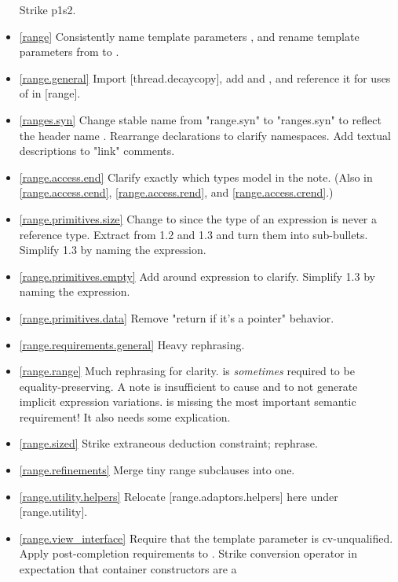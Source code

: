 \begin{itemize}
  Strike p1s2.
\item \ref{range} Consistently name
   template parameters ,
  and rename  template parameters from  to .
\item \ref{range.general} Import [thread.decaycopy], add  and
  , and reference it for uses of  in [range].
\item \ref{ranges.syn} Change stable name from "range.syn" to "ranges.syn" to
  reflect the header name .
  Rearrange declarations to clarify namespaces.
  Add textual descriptions to "link" comments.
\item \ref{range.access.end} Clarify exactly which types model 
  in the note. (Also in \ref{range.access.cend}, \ref{range.access.rend},
  and \ref{range.access.crend}.)
\item \ref{range.primitives.size} Change  to
   since the type of an expression is never a reference type.
  Extract  from 1.2 and 1.3 and turn them into
  sub-bullets. Simplify 1.3 by naming the expression.
\item \ref{range.primitives.empty} Add \tcode{()} around expression to clarify.
   Simplify 1.3 by naming the expression.
\item \ref{range.primitives.data}
  Remove "return  if it's a pointer" behavior.
\item \ref{range.requirements.general} Heavy rephrasing.
\item \ref{range.range} Much rephrasing for clarity.
   is \textit{sometimes} required to be equality-preserving.
  A note is insufficient to cause  and 
  to not generate implicit expression variations.
   is missing the most important
  semantic requirement! It also needs some explication.
\item \ref{range.sized} Strike extraneous deduction constraint; rephrase.
\item \ref{range.refinements} Merge tiny range subclauses into one.
\item \ref{range.utility.helpers} Relocate [range.adaptors.helpers] here
  under [range.utility].
\item \ref{range.view_interface} Require that the template parameter 
  is cv-unqualified. Apply post-completion requirements to .
  Strike conversion operator in expectation that container constructors are a

\end{itemize}
